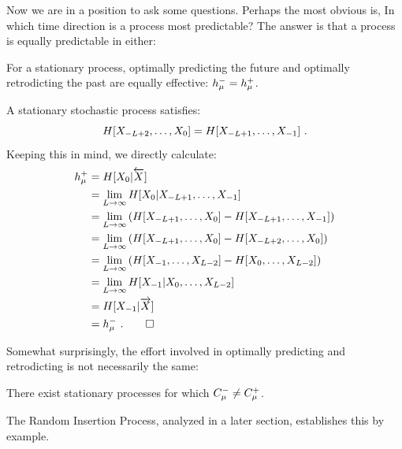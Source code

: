 Now we are in a position to ask some questions. Perhaps the most obvious is,
In which time direction is a process most predictable? The answer is that a
process is equally predictable in either:
\begin{Prop}
\cite{Crut98d}
For a stationary process, optimally predicting the future
and optimally retrodicting the past are equally effective:
$h_\mu^{-} = h_\mu^{+}$.
\label{prop:FuturePastEqPredict}
\end{Prop}

\begin{ProProp}
A stationary stochastic process satisfies:
\begin{equation}
H[X_{-L+2},\ldots,{X}_0] = H[X_{-L+1},\ldots,{X}_{-1}] ~.
\end{equation}
Keeping this in mind, we directly calculate:
\begin{align*}
h_\mu^{+} & = H[{X}_0|\overleftarrow {{X}}] \\
  & = \lim_{L \rightarrow \infty}
  	H[{X}_0|{X}_{-L+1},\ldots,{X}_{-1}] \\
  & = \lim_{L \rightarrow \infty}
    \left( H[{X}_{-L+1},\ldots,{X}_0]
		- H[{X}_{-L+1},\ldots,{X}_{-1}] \right) \\
  & = \lim_{L \rightarrow \infty}
    \left( H[{X}_{-L+1},\ldots,{X}_0]
		- H[{X}_{-L+2},\ldots,{X}_0] \right) \\
  & = \lim_{L \rightarrow \infty}
    \left( H[{X}_{-1},\ldots,{X}_{L-2}]
		- H[{X}_0,\ldots,{X}_{L-2}] \right) \\
  & = \lim_{L \rightarrow \infty}
  	H[{X}_{-1} | {X}_0,\ldots,{X}_{L-2}] \\
  & = H[{X}_{-1}|\overrightarrow{{X}}] \\
  & = h_\mu^{-} ~. \qed 
\end{align*}
\end{ProProp}

Somewhat surprisingly, the effort involved in optimally predicting and
retrodicting is not necessarily the same:
\begin{Prop}
\cite{Crut91b}
There exist stationary processes for which $C_\mu^{-} \neq C_\mu^{+}$.
\label{ProcessNotTimeSymmetric}
\end{Prop}

\begin{ProProp}
The Random Insertion Process, analyzed in a later section,
establishes this by example.
\end{ProProp}

